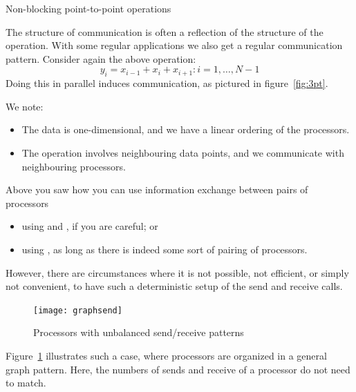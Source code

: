
 {Non-blocking point-to-point operations}
\label{sec:nonblock}

The structure of communication is often a reflection of the structure
of the operation.
With some regular applications we also get a regular communication pattern.
Consider again the above operation:
\[ y_i=x_{i-1}+x_i+x_{i+1}\colon i=1,\ldots,N-1 \]
Doing this in parallel induces communication, as pictured in figure~\ref{fig:3pt}.


We note:
\begin{itemize}
\item The data is one-dimensional, and we have a linear ordering of the processors.
\item The operation involves neighbouring data points, and we communicate
  with neighbouring processors.
\end{itemize}

Above you saw how you can use information exchange between pairs of processors
\begin{itemize}
\item using  and , if you are careful; or
\item using , as long as there is indeed some sort of pairing of processors.
\end{itemize}
However, there are circumstances where it is not possible, not efficient, or simply not
convenient, to have such a deterministic setup of the send and receive calls.
%
\begin{figure}[ht]
  \texttt{[image: graphsend]}
  \caption{Processors with unbalanced send/receive patterns}
  \label{fig:graphsend}
\end{figure}
%
Figure~\ref{fig:graphsend} illustrates such a case, where processors are
organized in a general graph pattern. Here, the numbers of sends and receive
of a processor do not need to match.

